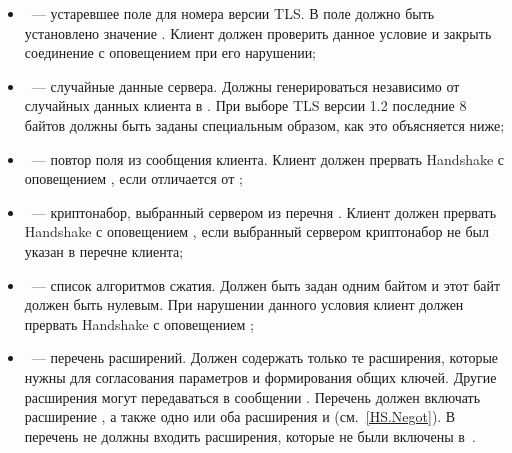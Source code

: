 \begin{itemize}
\item
{}~---  устаревшее поле для номера версии TLS. В поле должно 
быть установлено значение .
%
Клиент должен проверить данное условие и закрыть соединение с оповещением 
 при его нарушении; 


\item
{}~--- случайные данные сервера. Должны генерироваться независимо от 
случайных данных клиента в .
%
При выборе TLS версии 1.2 последние 8 байтов  должны быть 
заданы специальным образом, как это объясняется ниже;

\item
{}~--- повтор поля  из 
сообщения  клиента.
%
%
Клиент должен прервать Handshake с оповещением 
, если  
отличается от ;

\item
{}~--- криптонабор, выбранный сервером из перечня 
. 
%
Клиент должен прервать Handshake с оповещением 
, если выбранный сервером криптонабор не 
был указан в перечне клиента;

\item
{}~--- список алгоритмов сжатия.
Должен быть задан одним байтом и этот байт должен быть нулевым. При 
нарушении данного условия клиент должен прервать Handshake с оповещением 
;

\item
{}~--- перечень расширений. Должен содержать только те
расширения, которые нужны для согласования параметров и формирования общих
ключей. Другие расширения могут передаваться в сообщении
. Перечень должен включать расширение
, а также одно или оба расширения
 и 
(см.~\ref{HS.Negot}). 
В перечень не должны входить расширения, которые не были включены
в~.
\end{itemize}

